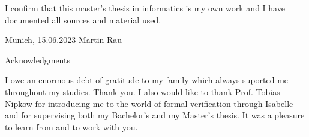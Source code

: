 \documentclass[headsepline,footsepline,footinclude=false,oneside,fontsize=11pt,paper=a4,listof=totoc,bibliography=totoc]{scrbook} %
\newcommand*{\getAuthor}{Martin Rau}
\newcommand*{\getDoctype}{Master's Thesis in Informatics}
\newcommand*{\getSubmissionDate}{15.06.2023}
\newcommand*{\getSubmissionLocation}{Munich}
\begin{document}
\thispagestyle{empty}
\vspace*{0.8\textheight}
\noindent
I confirm that this \MakeLowercase{\getDoctype{}} is my own work and I have documented all sources and material used.

\vspace{15mm}
\noindent
\getSubmissionLocation{}, \getSubmissionDate{} \hspace{50mm} \getAuthor{}

\cleardoublepage{}


%
\thispagestyle{empty}

\vspace*{20mm}

\begin{center}
{ Acknowledgments}
\end{center}

\vspace{10mm}

I owe an enormous debt of gratitude to my family which always suported me throughout my studies.
Thank you. I also would like to thank Prof. Tobias Nipkow for introducing me to the world of formal
verification through Isabelle and for supervising both my Bachelor's and my Master's thesis. It was
a pleasure to learn from and to work with you.

\cleardoublepage{}


\chapter{\abstractname}
\end{document}
